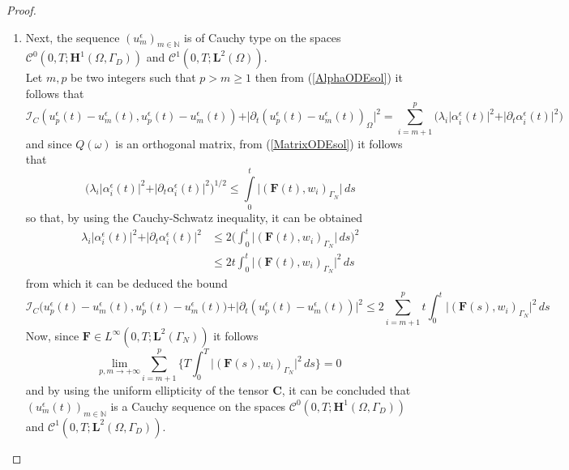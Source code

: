 \begin{proof}
\begin{enumerate}
    \item Next, the sequence $(u^{\epsilon}_m)_{m \in \mathbb{N}}$ is of Cauchy type on the spaces $\mathcal{C}^0(0,T;\mathbf{H}^1(\Omega, \Gamma_D))$ and $\mathcal{C}^1(0,T; \mathbf{L}^2(\Omega))$.\\
    Let $m,p$ be two integers such that $p > m \geq 1$ then from (\ref{AlphaODEsol}) it follows that
    \begin{equation*}
        \mathcal{I}_C(u_p^{\epsilon}(t)- u_m^{\epsilon}(t),u_p^{\epsilon}(t)- u_m^{\epsilon}(t)) + \vert \partial_t (u_p^{\epsilon}(t)- u_m^{\epsilon}(t))_{\Omega} \vert^2 = \sum_{i=m+1}^p \big( \lambda_i \vert \alpha_i^{\epsilon}(t) \vert^2 + \vert \partial_t \alpha_i^{\epsilon}(t) \vert^2 \big) 
    \end{equation*}
    and since $Q(\omega)$ is an orthogonal matrix, from (\ref{MatrixODEsol}) it follows that
    \begin{equation}
        \label{AlphaBound}
        \big( \lambda_i \vert \alpha_i^{\epsilon}(t) \vert^2 + \vert \partial_t \alpha_i^{\epsilon}(t) \vert^2 \big)^{1/2} \leq \int \limits_0^t \vert (\mathbf{F}(t),w_i)_{\Gamma_N} \vert \, ds 
    \end{equation}
    so that, by using the Cauchy-Schwatz inequality, it can be obtained
    \begin{align*}
        \lambda_i \vert \alpha_i^{\epsilon}(t) \vert^2 + \vert \partial_t \alpha_i^{\epsilon}(t) \vert^2 &\leq 2 \big( \int_0^t \vert (\mathbf{F}(t),w_i)_{\Gamma_N} \vert \, ds \big)^2 \\
        & \leq  2 t \int_0^t \vert (\mathbf{F}(t),w_i)_{\Gamma_N} \vert^2 \, ds
    \end{align*}
    from which it can be deduced the bound
    \begin{equation*}
        \mathcal{I}_C \big(u_p^{\epsilon}(t) - u_m^{\epsilon}(t),u_p^{\epsilon}(t) - u_m^{\epsilon}(t) \big) + \vert \partial_t (u_p^{\epsilon}(t) - u_m^{\epsilon}(t)) \vert^2 \leq 2 \sum_{i=m+1}^p t \int_0^t \vert (\mathbf{F}(s),w_i)_{\Gamma_N} \vert^2 \, ds
    \end{equation*}
    Now, since $\mathbf{F} \in L^{\infty}(0,T;\mathbf{L}^2( \Gamma_N))$ it follows
    \begin{equation*}
        \underset{p,m \longrightarrow + \infty}{\text{lim}} \sum_{i=m+1}^p \big \{ T \int_0^T \vert (\mathbf{F}(s),w_i)_{\Gamma_N}\vert^2 \, ds \big \} = 0
    \end{equation*}
    and by using the uniform ellipticity of the tensor $\mathbf{C}$, it can be concluded that $(u_m^{\epsilon}(t))_{m \in \mathbb{N}}$ is a Cauchy sequence on the spaces $\mathcal{C}^0(0,T; \mathbf{H}^1(\Omega, \Gamma_D))$ and $\mathcal{C}^1(0,T; \mathbf{L}^2(\Omega, \Gamma_D))$.
    

\end{enumerate}
\end{proof}
